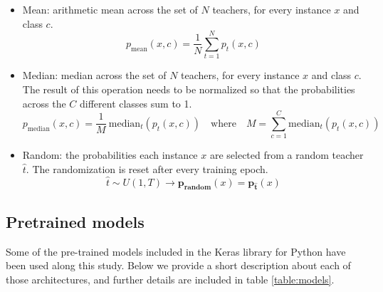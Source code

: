 \documentclass{elsarticle}
\begin{document}
	 \begin{itemize}
	 	\item Mean: arithmetic mean across the set of $N$ teachers, for every instance $x$ and class $c$. 
	 	$$p_{\text{mean}}(x, c) = \frac{1}{N} \sum_{t=1}^N p_{t}(x, c)$$
	 	\item Median: median across the set of $N$ teachers, for every instance $x$ and class $c$. The result of this operation needs to be normalized so that the probabilities across the $C$ different classes sum to 1. $$p_{\text{median}}(x, c) = \frac{1}{M} \ \text{median}_t( p_{t}(x, c)) \quad \text{where} \quad M = \sum_{c=1}^C  \text{median}_t( p_{t}(x, c))$$
	 	\item Random: the probabilities each instance $x$ are selected from a random teacher $\hat{t}$. The randomization is reset after every training epoch. 
	 	$$\hat{t} \sim U(1, T) \rightarrow \mathbf{p_\text{random}}(x) = \mathbf{p_{\hat{t}}}(x)$$ 
 	\end{itemize}
 
    \subsection{Pretrained models}
    Some of the pre-trained models included in the Keras library for Python \citep{chollet2015keras} have been used along this study. Below we provide a short description about each of those architectures, and further details are included in table \ref{table:models}.
    
\end{document}

